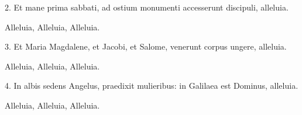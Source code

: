 2. Et mane prima sabbati,
ad ostium monumenti
accesserunt discipuli, alleluia.
 
Alleluia, Alleluia, Alleluia.
 
3. Et Maria Magdalene,
et Jacobi, et Salome,
venerunt corpus ungere, alleluia.
 
Alleluia, Alleluia, Alleluia.
 
4. In albis sedens Angelus,
praedixit mulieribus:
in Galilaea est Dominus, alleluia.
 
Alleluia, Alleluia, Alleluia.
 
